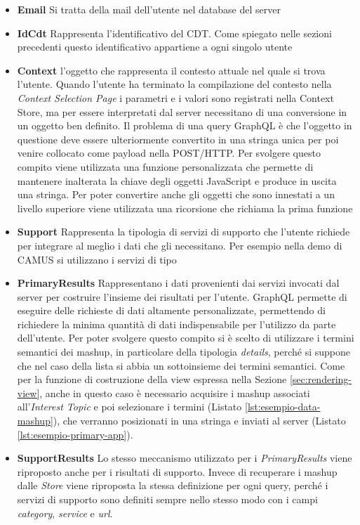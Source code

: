 \begin{itemize}
	\item \textbf{Email}
	Si tratta della mail dell'utente nel database del server
	\item \textbf{IdCdt}
	Rappresenta l'identificativo del CDT. Come spiegato nelle sezioni precedenti questo identificativo appartiene a ogni singolo utente
	\item \textbf{Context}
	\upe l'oggetto che rappresenta il contesto attuale nel quale si trova l'utente. Quando l'utente ha terminato la compilazione del contesto nella \emph{Context Selection Page} i parametri e i valori sono registrati nella Context Store, ma per essere interpretati dal server necessitano di una conversione in un oggetto ben definito. Il problema di una query GraphQL è che l'oggetto in questione deve essere ulteriormente convertito in una stringa unica per poi venire collocato come payload nella POST/HTTP. Per svolgere questo compito viene utilizzata una funzione personalizzata che permette di mantenere inalterata la chiave degli oggetti JavaScript e produce in uscita una stringa. Per poter convertire anche gli oggetti che sono innestati a un livello superiore viene utilizzata una ricorsione che richiama la prima funzione
	\item \textbf{Support}
	Rappresenta la tipologia di servizi di supporto che l'utente richiede per integrare al meglio i dati che gli necessitano. Per esempio nella demo di CAMUS si utilizzano i servizi di tipo 
	\item \textbf{PrimaryResults}
	Rappresentano i dati provenienti dai servizi invocati dal server per costruire l'insieme dei risultati per l'utente. GraphQL permette di eseguire delle richieste di dati altamente personalizzate, permettendo di richiedere la minima quantità di dati indispensabile per l'utilizzo da parte dell'utente. Per poter svolgere questo compito si è scelto di utilizzare i termini semantici dei mashup, in particolare della tipologia \emph{details}, perché si suppone che nel caso della lista si abbia un sottoinsieme dei termini semantici. Come per la funzione di costruzione della view espressa nella Sezione \ref{sec:rendering-view}, anche in questo caso è necessario acquisire i mashup associati all'\emph{Interest Topic} e poi selezionare i termini (Listato \ref{lst:esempio-data-mashup}), che verranno posizionati in una stringa e inviati al server (Listato \ref{lst:esempio-primary-app}).
	\item \textbf{SupportResults}
	Lo stesso meccanismo utilizzato per i \emph{PrimaryResults} viene riproposto anche per i risultati di supporto. Invece di recuperare i mashup dalle \emph{Store} viene riproposta la stessa definizione per ogni query, perché i servizi di supporto sono definiti sempre nello stesso modo con i campi \emph{category}, \emph{service} e \emph{url}.
\end{itemize}

